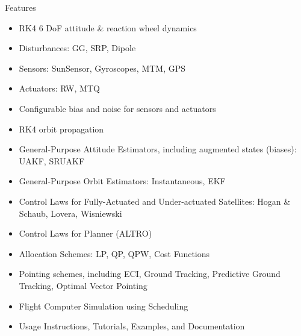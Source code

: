 \documentclass[conference]{IEEEtran}
\begin{document}
\newpage

Features
\begin{itemize}
    \item RK4 6 DoF attitude \& reaction wheel dynamics
    \item Disturbances: GG, SRP, Dipole
    \item Sensors: SunSensor, Gyroscopes, MTM, GPS
    \item Actuators: RW, MTQ
    \item Configurable bias and noise for sensors and actuators
    \item RK4 orbit propagation
    \item General-Purpose Attitude Estimators, including augmented states (biases): UAKF, SRUAKF
    \item General-Purpose Orbit Estimators: Instantaneous, EKF
    \item Control Laws for Fully-Actuated and Under-actuated Satellites: Hogan \& Schaub, Lovera, Wisniewski
    \item Control Laws for Planner (ALTRO)
    \item Allocation Schemes: LP, QP, QPW, Cost Functions
    \item Pointing schemes, including ECI, Ground Tracking, Predictive Ground Tracking, Optimal Vector Pointing
    \item Flight Computer Simulation using Scheduling
    \item Usage Instructions, Tutorials, Examples, and Documentation
\end{itemize}

\end{document}
